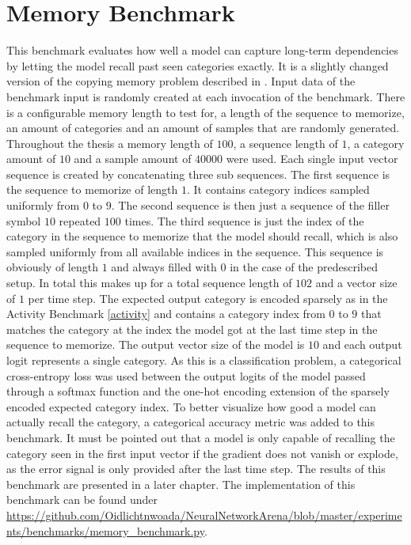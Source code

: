 \documentclass[draft,final]{vutinfth} %
\begin{document}
    \section{Memory Benchmark} \label{memory}
    This benchmark evaluates how well a model can capture long-term dependencies by letting the model recall past seen categories exactly.
    It is a slightly changed version of the copying memory problem described in \cite{UnitaryRNNs}.
    Input data of the benchmark input is randomly created at each invocation of the benchmark.
    There is a configurable memory length to test for, a length of the sequence to memorize, an amount of categories and an amount of samples that are randomly generated.
    Throughout the thesis a memory length of $100$, a sequence length of $1$, a category amount of $10$ and a sample amount of $40000$ were used.
    Each single input vector sequence is created by concatenating three sub sequences.
    The first sequence is the sequence to memorize of length $1$.
    It contains category indices sampled uniformly from $0$ to $9$.
    The second sequence is then just a sequence of the filler symbol $10$ repeated $100$ times.
    The third sequence is just the index of the category in the sequence to memorize that the model should recall, which is also sampled uniformly from all available indices in the sequence.
    This sequence is obviously of length $1$ and always filled with $0$ in the case of the predescribed setup.
    In total this makes up for a total sequence length of $102$ and a vector size of $1$ per time step. 
    The expected output category is encoded sparsely as in the Activity Benchmark \ref{activity} and contains a category index from $0$ to $9$ that matches the category at the index the model got at the last time step in the sequence to memorize.
    The output vector size of the model is $10$ and each output logit represents a  single category.
    As this is a classification problem, a categorical cross-entropy loss was used between the output logits of the model passed through a softmax function and the one-hot encoding extension of the sparsely encoded expected category index.
    To better visualize how good a model can actually recall the category, a categorical accuracy metric was added to this benchmark.
    It must be pointed out that a model is only capable of recalling the category seen in the first input vector if the gradient does not vanish or explode, as the error signal is only provided after the last time step.
    The results of this benchmark are presented in a later chapter.
    The implementation of this benchmark can be found under \url{https://github.com/Oidlichtnwoada/NeuralNetworkArena/blob/master/experiments/benchmarks/memory_benchmark.py}.
\end{document}
